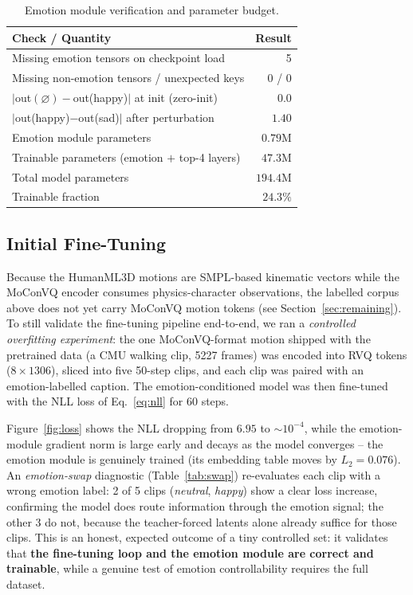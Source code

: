 \documentclass[conference]{IEEEtran}
\begin{document}
\begin{table}[t]
\caption{Emotion module verification and parameter budget.}
\label{tab:verify}
\centering
\small
\begin{tabular}{lr}
\toprule
\textbf{Check / Quantity} & \textbf{Result} \\
\midrule
Missing emotion tensors on checkpoint load & 5 \\
Missing non-emotion tensors / unexpected keys & 0 / 0 \\
$|$out$(\varnothing)-$out(happy)$|$ at init (zero-init) & $0.0$ \\
$|$out(happy)$-$out(sad)$|$ after perturbation & $1.40$ \\
\midrule
Emotion module parameters & $0.79$M \\
Trainable parameters (emotion $+$ top-4 layers) & $47.3$M \\
Total model parameters & $194.4$M \\
Trainable fraction & $24.3\%$ \\
\bottomrule
\end{tabular}
\end{table}

\subsection{Initial Fine-Tuning}
Because the HumanML3D motions are SMPL-based kinematic vectors while the
MoConVQ encoder consumes physics-character observations, the labelled corpus
above does not yet carry MoConVQ motion tokens (see
Section~\ref{sec:remaining}). To still validate the fine-tuning pipeline
end-to-end, we ran a \emph{controlled overfitting experiment}: the one
MoConVQ-format motion shipped with the pretrained data (a CMU walking clip,
5227 frames) was encoded into RVQ tokens ($8\times1306$), sliced into five
50-step clips, and each clip was paired with an emotion-labelled caption. The
emotion-conditioned model was then fine-tuned with the NLL loss of
Eq.~\ref{eq:nll} for 60 steps.

Figure~\ref{fig:loss} shows the NLL dropping from $6.95$ to $\sim\!10^{-4}$,
while the emotion-module gradient norm is large early and decays as the model
converges -- the emotion module is genuinely trained (its embedding table
moves by $L_2=0.076$). An \emph{emotion-swap} diagnostic
(Table~\ref{tab:swap}) re-evaluates each clip with a wrong emotion label:
2 of 5 clips (\textit{neutral}, \textit{happy}) show a clear loss increase,
confirming the model does route information through the emotion signal; the
other 3 do not, because the teacher-forced latents alone already suffice for
those clips. This is an honest, expected outcome of a tiny controlled set:
it validates that \textbf{the fine-tuning loop and the emotion module are
correct and trainable}, while a genuine test of emotion controllability
requires the full dataset.
\end{document}
